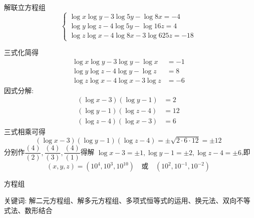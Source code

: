\begin{questions}
    \question 解联立方程组
    \[
    \begin{cases}
    \log x \log y - 3 \log 5 y - \log 8 x = -4 \\
    \log y \log z - 4 \log 5 y - \log 16 z = 4 \\
    \log z \log x - 4 \log 8 x - 3 \log 625 z = -18
    \end{cases}
    \]
    \begin{solution}
        三式化简得
        \begin{align*}
        \log x \log y - 3 \log  y - \log x &= -1 \\
        \log y \log z - 4 \log  y - \log  z &= 8 \\
        \log z \log x - 4 \log  x - 3 \log z &= -6
        \end{align*}
        因式分解:
        \begin{align}
        (\log x-3)( \log y -1 )&= 2 \\
        (\log y-1)( \log z -4 )&= 12 \\
        (\log z-4)( \log x -3 )&= 6 
        \end{align}
        三式相乘可得
        \begin{equation}
        (\log x-3)( \log y -1 )(\log z-4)= \pm\sqrt{2\cdot 6\cdot 12} =\pm12
        \end{equation}
        分别作$\dfrac{(4)}{(2)},\dfrac{(4)}{(3)},\dfrac{(4)}{(1)}$得解   $\log x-3= \pm1,\log y -1=\pm2,\log z-4=\pm6$,即\[
        (x,y,z) = (10^4, 10^3, 10^{10}) \quad \text{或} \quad (10^2, 10^{-1}, 10^{-2})
        \]
    \end{solution}

\end{questions}
\pagebreak

\begin{center}
  {\fontsize{30pt}{26pt}\selectfont
    \hypertarget{方程组}{方程组} \label{方程组}
  }
\end{center}
\separator
\begin{center}
    关键词: 解二元方程组、解多元方程组、多项式恒等式的运用、换元法、双向不等式法、数形结合
\end{center}
\vspace{0.5pt}


